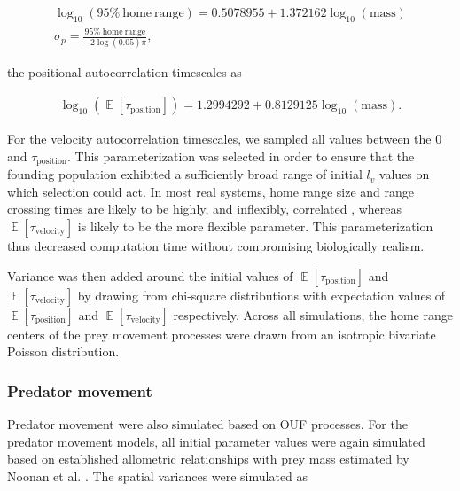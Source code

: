 \documentclass[12pt]{article}
\DeclareMathOperator{\E}{\mathbb{E}}
\begin{document}
\begin{gather}\label{eq:prey-allo}
\log_{10}(\mathrm{95\%~home~range}) = 0.5078955 + 1.372162 \log_{10}(\mathrm{mass}) \\
\sigma_p = \frac{\mathrm{95\%~home~range}}{-2 \log(0.05)  \pi},
\end{gather}

the positional autocorrelation timescales as

\begin{gather}\label{eq:prey-allo-taup}
\log_{10}(\E[\tau_\mathrm{position}]) = 1.2994292 + 0.8129125 \log_{10}(\mathrm{mass}).
\end{gather}

For the velocity autocorrelation timescales, we sampled all values between the 0 and $\tau_\mathrm{position}$. This parameterization was selected in order to ensure that the founding population exhibited a sufficiently broad range of initial $l_v$ values on which selection could act. In most real systems, home range size and range crossing times are likely to be highly, and inflexibly, correlated \cite{Noonan:2020}, whereas $\E[\tau_\mathrm{velocity}]$ is likely to be the more flexible parameter. This parameterization thus decreased computation time without compromising biologically realism.


Variance was then added around the initial values of $\E[\tau_\mathrm{position}]$ and $\E[\tau_\mathrm{velocity}]$ by drawing from chi-square distributions with expectation values of $\E[\tau_\mathrm{position}]$ and $\E[\tau_\mathrm{velocity}]$ respectively. Across all simulations, the home range centers of the prey movement processes were drawn from an isotropic bivariate Poisson distribution.

\subsubsection*{Predator movement}

Predator movement were also simulated based on OUF processes. For the predator movement models, all initial parameter values were again simulated based on established allometric relationships with prey mass estimated by Noonan et al. \cite{Noonan:2020}. The spatial variances were simulated as
\end{document}
